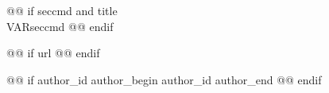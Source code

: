 
@@ if seccmd and title
\\VAR{seccmd}{}
\label{sec:\VAR{sec}}
@@ endif

@@ if url
@@ endif

@@ if author_id
\ifcmt
  author_begin
    author_id 
  author_end
\fi
@@ endif
